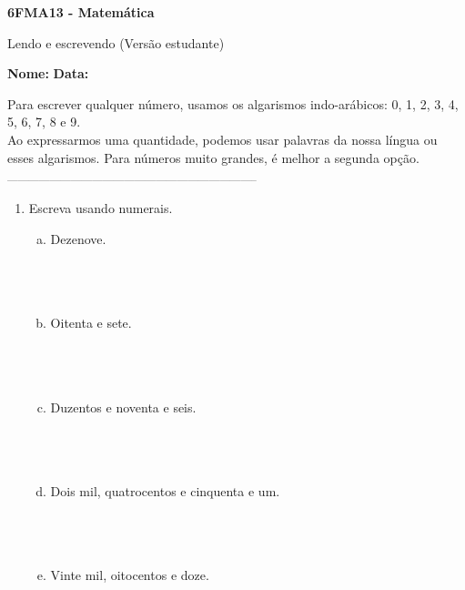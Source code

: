 \documentclass[a4paper,14pt]{article}
\begin{document}
	
	\noindent\textbf{6FMA13 - Matemática} 
	
	\begin{center}Lendo e escrevendo (Versão estudante)
	\end{center}
	
	\noindent\textbf{Nome:} \underline{\hspace{10cm}}
	\noindent\textbf{Data:} \underline{\hspace{4cm}}
	
	
	\begin{multicols}{2}
		\noindent Para escrever qualquer número, usamos os algarismos indo-arábicos: 0, 1, 2, 3, 4, 5, 6, 7, 8 e 9. \\
		Ao expressarmos uma quantidade, podemos usar palavras da nossa língua ou esses algarismos. Para números muito grandes, é melhor a segunda opção.
		\noindent\textsubscript{-----------------------------------------------------------------------}
		\begin{enumerate} 
			\item Escreva usando numerais.
			\begin{enumerate}[a)]
				\item Dezenove. \\\\\\\\
				\item Oitenta e sete. \\\\\\\\
				\item Duzentos e noventa e seis. \\\\\\\\
				\item Dois mil, quatrocentos e cinquenta e um. \\\\\\\\
				\item Vinte mil, oitocentos e doze. \\\\\\\\

\end{enumerate}
\end{enumerate}
\end{multicols}
\end{document}
